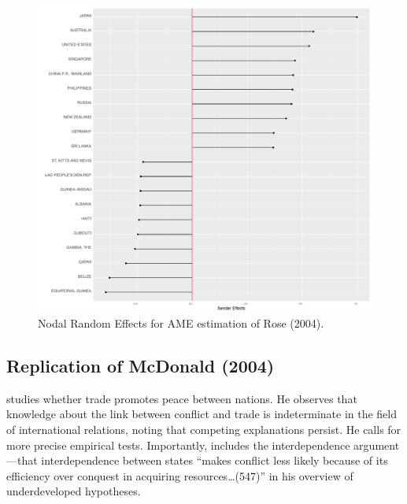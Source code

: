 
\begin{figure}
\includegraphics[width=\textwidth]{ABplot_rose_top10.pdf}
 \caption{Nodal Random Effects for AME estimation of Rose (2004).}\label{fig:roser}
\end{figure}


\newpage
\subsection{Replication of McDonald (2004)}

\citet{mcdonald:2004} studies whether trade promotes peace between nations. He observes that knowledge about the link between conflict and trade is indeterminate in the field of international relations, noting that competing explanations persist. He calls for more precise empirical tests.  Importantly, \citet{mcdonald:2004} includes the interdependence argument---that interdependence between states ``makes conflict less likely because of its efficiency over conquest in acquiring resources\ldots (547)'' in his overview of underdeveloped hypotheses. 

